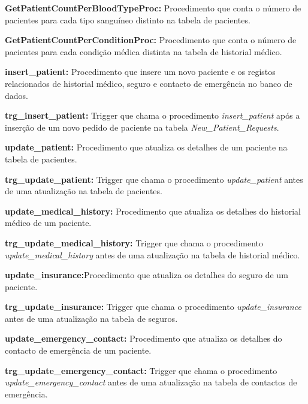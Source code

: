 \vspace{0.15cm}
\textbf{GetPatientCountPerBloodTypeProc:} Procedimento que conta o número de pacientes para cada tipo sanguíneo distinto na tabela de pacientes.

\vspace{0.15cm}
\textbf{GetPatientCountPerConditionProc:} Procedimento que conta o número de pacientes para cada condição médica distinta na tabela de historial médico.

\vspace{0.15cm}
\textbf{insert\_patient:} Procedimento que insere um novo paciente e os registos relacionados de historial médico, seguro e contacto de emergência no banco de dados.

\vspace{0.15cm}
\textbf{trg\_insert\_patient:} Trigger que chama o procedimento \textit{insert\_patient} após a inserção de um novo pedido de paciente na tabela \textit{New\_Patient\_Requests}.

\vspace{0.15cm}
\textbf{update\_patient:} Procedimento que atualiza os detalhes de um paciente na tabela de pacientes.

\vspace{0.15cm}
\textbf{trg\_update\_patient:} Trigger que chama o procedimento \textit{update\_patient} antes de uma atualização na tabela de pacientes.

\vspace{0.15cm}
\textbf{update\_medical\_history:} Procedimento que atualiza os detalhes do historial médico de um paciente.

\vspace{0.15cm}
\textbf{trg\_update\_medical\_history:} Trigger que chama o procedimento \textit{update\_medical\_history} antes de uma atualização na tabela de historial médico.

\vspace{0.15cm}
\textbf{update\_insurance:}Procedimento que atualiza os detalhes do seguro de um paciente.

\vspace{0.15cm}
\textbf{trg\_update\_insurance:} Trigger que chama o procedimento \textit{update\_insurance} antes de uma atualização na tabela de seguros.

\vspace{0.15cm}
\textbf{update\_emergency\_contact:} Procedimento que atualiza os detalhes do contacto de emergência de um paciente.

\vspace{0.15cm}
\textbf{trg\_update\_emergency\_contact:} Trigger que chama o procedimento \textit{update\_emergency\_contact} antes de uma atualização na tabela de contactos de emergência.

